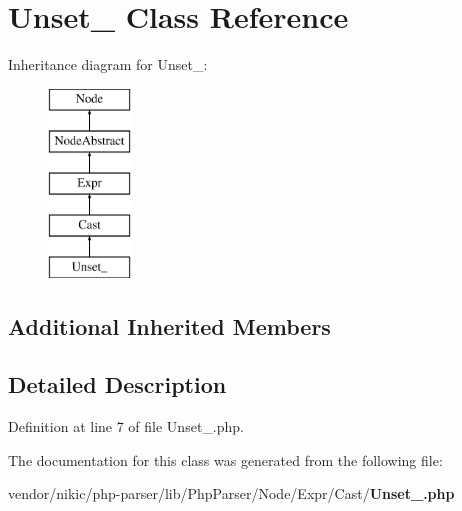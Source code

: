 \section{Unset\+\_\+ Class Reference}
\label{class_php_parser_1_1_node_1_1_expr_1_1_cast_1_1_unset__}
Inheritance diagram for Unset\+\_\+\+:\begin{figure}[H]
\begin{center}
\leavevmode
\includegraphics[height=5.000000cm]{class_php_parser_1_1_node_1_1_expr_1_1_cast_1_1_unset__}
\end{center}
\end{figure}
\subsection*{Additional Inherited Members}


\subsection{Detailed Description}


Definition at line 7 of file Unset\+\_\+.\+php.



The documentation for this class was generated from the following file\+:\begin{DoxyCompactItemize}
\item 
vendor/nikic/php-\/parser/lib/\+Php\+Parser/\+Node/\+Expr/\+Cast/{\bf Unset\+\_\+.\+php}\end{DoxyCompactItemize}
